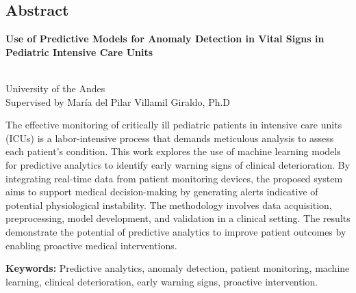 \begin{titlepage}
  \centering
  \newpage
  \pagestyle{empty}

  \chapter*{Abstract}
  \vspace{0.8cm}

  {\bf\centering Use of Predictive Models for Anomaly Detection in Vital Signs in Pediatric Intensive Care Units} \\
  \vspace{0.8cm}

  \begin{flushright}
    \AuthorName \\
    University of the Andes \\
    Supervised by María del Pilar Villamil Giraldo, Ph.D
  \end{flushright}

  \vspace{0.5cm}

  \justifying The effective monitoring of critically ill pediatric patients in intensive care units (ICUs) is a labor-intensive process that demands meticulous analysis to assess each patient's condition. This work explores the use of machine learning models for predictive analytics to identify early warning signs of clinical deterioration. By integrating real-time data from patient monitoring devices, the proposed system aims to support medical decision-making by generating alerts indicative of potential physiological instability. The methodology involves data acquisition, preprocessing, model development, and validation in a clinical setting. The results demonstrate the potential of predictive analytics to improve patient outcomes by enabling proactive medical interventions.

  \begin{flushleft}
    \vspace{0.5cm}
    \textbf{Keywords:} Predictive analytics, anomaly detection, patient monitoring, machine learning, clinical deterioration, early warning signs,  proactive intervention.

  \end{flushleft}

\end{titlepage}
